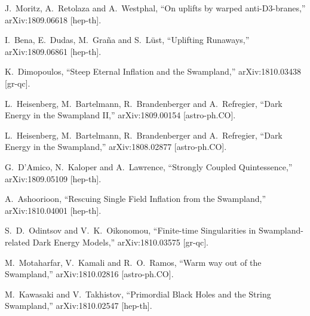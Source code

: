 \documentclass[11pt,a4paper]{article}
\begin{document}
\begin{thebibliography}{99}
  J.~Moritz, A.~Retolaza and A.~Westphal,
  ``On uplifts by warped anti-D3-branes,''
  arXiv:1809.06618 [hep-th].

  I.~Bena, E.~Dudas, M.~Graña and S.~Lüst,
  ``Uplifting Runaways,''
  arXiv:1809.06861 [hep-th].
  
  K.~Dimopoulos,
  ``Steep Eternal Inflation and the Swampland,''
  arXiv:1810.03438 [gr-qc].

  L.~Heisenberg, M.~Bartelmann, R.~Brandenberger and A.~Refregier,
  ``Dark Energy in the Swampland II,''
  arXiv:1809.00154 [astro-ph.CO].


  L.~Heisenberg, M.~Bartelmann, R.~Brandenberger and A.~Refregier,
  ``Dark Energy in the Swampland,''
  arXiv:1808.02877 [astro-ph.CO].
  
  G.~D'Amico, N.~Kaloper and A.~Lawrence,
  ``Strongly Coupled Quintessence,''
  arXiv:1809.05109 [hep-th].

  A.~Ashoorioon,
  ``Rescuing Single Field Inflation from the Swampland,''
  arXiv:1810.04001 [hep-th].

  S.~D.~Odintsov and V.~K.~Oikonomou,
  ``Finite-time Singularities in Swampland-related Dark Energy Models,''
  arXiv:1810.03575 [gr-qc].


  M.~Motaharfar, V.~Kamali and R.~O.~Ramos,
  ``Warm way out of the Swampland,''
  arXiv:1810.02816 [astro-ph.CO].


  M.~Kawasaki and V.~Takhistov,
  ``Primordial Black Holes and the String Swampland,''
  arXiv:1810.02547 [hep-th].


\end{thebibliography}
\end{document}
